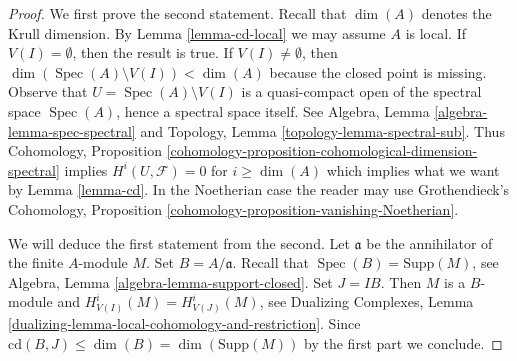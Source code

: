 \documentclass[10pt,a4paper]{amsart}
\theoremstyle{plain}
\theoremstyle{definition}
\theoremstyle{remark}
\numberwithin{equation}{subsection}
\def\Spec{\mathop{\mathrm{Spec}}}
\begin{document}
\begin{proof}
We first prove the second statement.
Recall that $\dim(A)$ denotes the Krull dimension. By
Lemma \ref{lemma-cd-local} we may assume $A$ is local.
If $V(I) = \emptyset$, then the result is true.
If $V(I) \not = \emptyset$, then
$\dim(\Spec(A) \setminus V(I)) < \dim(A)$ because
the closed point is missing. Observe that
$U = \Spec(A) \setminus V(I)$ is a quasi-compact
open of the spectral space $\Spec(A)$, hence a spectral space itself.
See Algebra, Lemma \ref{algebra-lemma-spec-spectral} and
Topology, Lemma \ref{topology-lemma-spectral-sub}.
Thus Cohomology, Proposition
\ref{cohomology-proposition-cohomological-dimension-spectral}
implies $H^i(U, \mathcal{F}) = 0$ for $i \geq \dim(A)$
which implies what we want by Lemma \ref{lemma-cd}.
In the Noetherian case the reader may use
Grothendieck's Cohomology, Proposition
\ref{cohomology-proposition-vanishing-Noetherian}.

\medskip\noindent
We will deduce the first statement from the second.
Let $\mathfrak a$ be the annihilator of the finite $A$-module $M$.
Set $B = A/\mathfrak a$. Recall that $\Spec(B) = \text{Supp}(M)$, see
Algebra, Lemma \ref{algebra-lemma-support-closed}.
Set $J = IB$. Then $M$ is a $B$-module
and $H^i_{V(I)}(M) = H^i_{V(J)}(M)$, see
Dualizing Complexes, Lemma
\ref{dualizing-lemma-local-cohomology-and-restriction}.
Since $\text{cd}(B, J) \leq \dim(B) = \dim(\text{Supp}(M))$
by the first part we conclude.
\end{proof}
\end{document}
